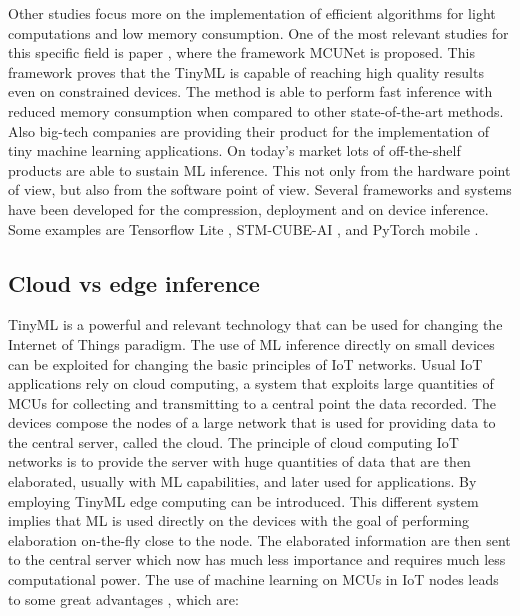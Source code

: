 \documentclass[12pt]{report}
\begin{document}
Other studies focus more on the implementation of efficient algorithms for light computations and low memory consumption. One of the most relevant studies for this specific field is paper \cite{lin2020mcunet}, where the framework MCUNet is proposed. This framework proves that the TinyML is capable of reaching high quality results even on constrained devices. The method is able to perform fast inference with reduced memory consumption when compared to other state-of-the-art methods.\\
Also big-tech companies are providing their product for the implementation of tiny machine learning applications. On today's market lots of off-the-shelf products are able to sustain ML inference. This not only from the hardware point of view, but also from the software point of view. Several frameworks and systems have been developed for the compression, deployment and on device inference. Some examples are Tensorflow Lite \cite{TF_lite}, STM-CUBE-AI \cite{stm_cube_ai}, and PyTorch mobile \cite{pytorch_mobile}.

\subsection{Cloud vs edge inference}
TinyML is a powerful and relevant technology that can be used for changing the Internet of Things paradigm. The use of ML inference directly on small devices can be exploited for changing the basic principles of IoT networks. Usual IoT applications rely on cloud computing, a system that exploits large quantities of MCUs for collecting and transmitting to a central point the data recorded. The devices compose the nodes of a large network that is used for providing data to the central server, called the cloud. The principle of cloud computing IoT networks is to provide the server with huge quantities of data that are then elaborated, usually with ML capabilities, and later used for applications. By employing TinyML edge computing can be introduced. This different system implies that ML is used directly on the devices with the goal of performing elaboration on-the-fly close to the node. The elaborated information are then sent to the central server which now has much less importance and requires much less computational power. The use of machine learning on MCUs in IoT nodes leads to some great advantages \cite{yu2017survey}, which are:
\end{document}
